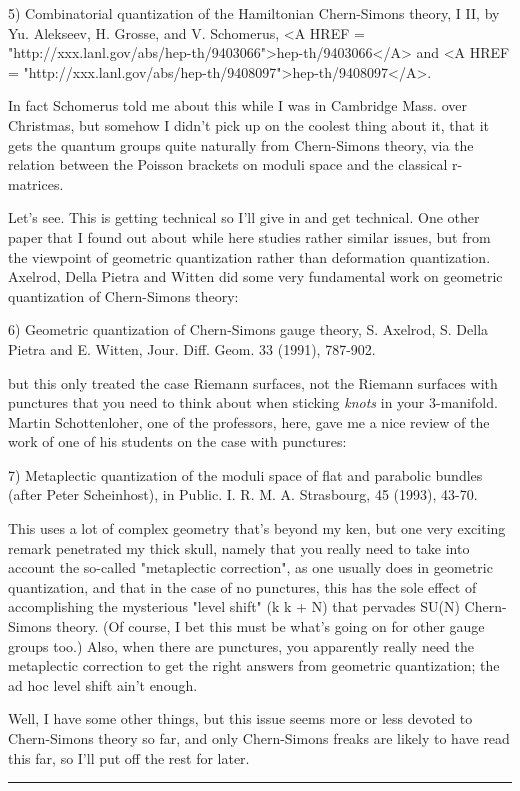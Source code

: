 5) Combinatorial quantization of the Hamiltonian Chern-Simons theory,
I \text{\&}  II, by Yu. Alekseev, H. Grosse, and V. Schomerus, <A HREF = "http://xxx.lanl.gov/abs/hep-th/9403066">hep-th/9403066</A>
and <A HREF = "http://xxx.lanl.gov/abs/hep-th/9408097">hep-th/9408097</A>.  

In fact Schomerus told me about this while I was in Cambridge Mass.
over Christmas, but somehow I didn't pick up on the coolest thing about it, 
that it gets the quantum groups quite naturally from Chern-Simons theory,
via the relation between the Poisson brackets on moduli space and
the classical r-matrices.

Let's see.  This is getting technical so I'll give in and get
technical.  One other paper that I found out about while here studies
rather similar issues, but from the viewpoint of geometric
quantization rather than deformation quantization.  Axelrod, Della Pietra and
Witten did some very fundamental work on geometric quantization of
Chern-Simons theory:

6) Geometric quantization of Chern-Simons gauge theory, S. Axelrod,
S. Della Pietra and E. Witten, Jour. Diff. Geom. 33 (1991), 787-902.

but this only treated the case Riemann surfaces, not the Riemann
surfaces with punctures that you need to think about when sticking
\emph{knots} in your 3-manifold.  Martin Schottenloher, one of the professors,
here, gave me a nice review of the work of one of his students on the
case with punctures:

7) Metaplectic quantization of the moduli space of flat and parabolic
bundles (after Peter Scheinhost), in Public. I. R. M. A. Strasbourg,
45 (1993), 43-70.

This uses a lot of complex geometry that's beyond my ken, but one
very exciting remark penetrated my thick skull, namely that you
really need to take into account the so-called "metaplectic correction", 
as one usually does in geometric quantization, and that in the case
of no punctures, this has the sole effect of accomplishing the
mysterious "level shift" (k \to  k + N) that pervades SU(N) Chern-Simons
theory.  (Of course, I bet this must be what's going on for other gauge
groups too.)  Also, when there are punctures, you apparently really need
the metaplectic correction to get the right answers from geometric
quantization; the ad hoc level shift ain't enough.

Well, I have some other things, but this issue seems more or less
devoted to Chern-Simons theory so far, and only Chern-Simons freaks
are likely to have read this far, so I'll put off the rest for later.
\par\noindent\rule{\textwidth}{0.4pt}

